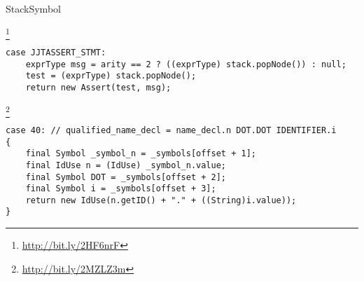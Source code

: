 \begin{pattern}{StackSymbol}

\instances{}

\footnote{\url{http://bit.ly/2HF6nrF}}

\begin{verbatim}
case JJTASSERT_STMT:
    exprType msg = arity == 2 ? ((exprType) stack.popNode()) : null;
    test = (exprType) stack.popNode();
    return new Assert(test, msg);
\end{verbatim}

\footnote{\url{http://bit.ly/2MZLZ3m}}

\begin{verbatim}
case 40: // qualified_name_decl = name_decl.n DOT.DOT IDENTIFIER.i
{
    final Symbol _symbol_n = _symbols[offset + 1];
    final IdUse n = (IdUse) _symbol_n.value;
    final Symbol DOT = _symbols[offset + 2];
    final Symbol i = _symbols[offset + 3];
    return new IdUse(n.getID() + "." + ((String)i.value));
}
\end{verbatim}

\detection{}

\discussion{}

\related{}

\end{pattern}